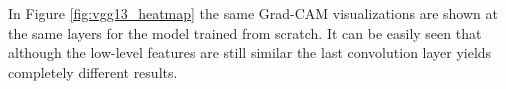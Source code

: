 \begin{figure}[H]
\label{fig:vgg13_pre_heatmap}
\end{figure}

In Figure \ref{fig:vgg13_heatmap} the same Grad-CAM visualizations are shown at the same layers for the model trained from scratch. It can be easily seen that although the low-level features are still similar the last convolution layer yields completely different results.

